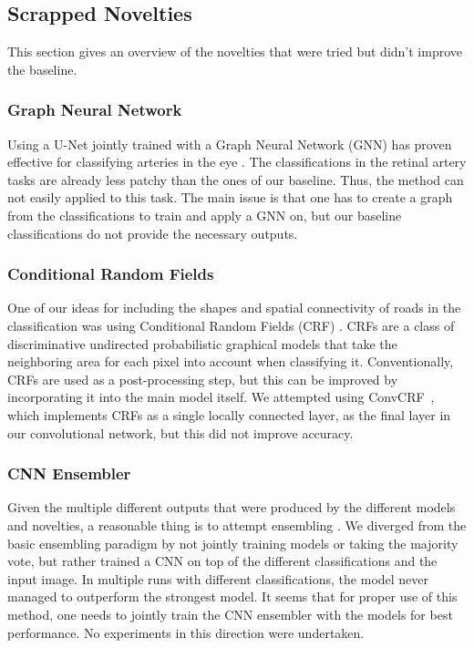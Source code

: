 \subsection{Scrapped Novelties}\label{novelties:scrapped}
    This section gives an overview of the novelties that were tried but didn't improve the baseline.
   
    \subsubsection{Graph Neural Network}
    Using a U-Net jointly trained with a Graph Neural Network (GNN) has proven effective for classifying arteries in the eye \cite{shin2019deep}.
    The classifications in the retinal artery tasks are already less patchy than the ones of our baseline. Thus, the method can not easily applied to this task.
    The main issue is that one has to create a graph from the classifications to train and apply a GNN on, but our baseline classifications do not provide the necessary outputs.
    
    \subsubsection{Conditional Random Fields}
    One of our ideas for including the shapes and spatial connectivity of roads in the classification was using Conditional Random Fields (CRF) \cite{crf1, crf2}.
    CRFs are a class of discriminative undirected probabilistic graphical models that take the neighboring area for each pixel into account when classifying it.
    Conventionally, CRFs are used as a post-processing step, but this can be improved by incorporating it into the main model itself.
    We attempted using ConvCRF~\cite{convcrf}, which implements CRFs as a single locally connected layer, as the final layer in our convolutional network, but this did not improve accuracy.
    
    \subsubsection{CNN Ensembler}
    Given the multiple different outputs that were produced by the different models and novelties, a reasonable thing is to attempt ensembling \cite{hansen1990neural}.
    We diverged from the basic ensembling paradigm by not jointly training models or taking the majority vote, but rather trained a CNN on top of the different classifications and the input image.
    In multiple runs with different classifications, the model never managed to outperform the strongest model.
    It seems that for proper use of this method, one needs to jointly train the CNN ensembler with the models for best performance.
    No experiments in this direction were undertaken.

